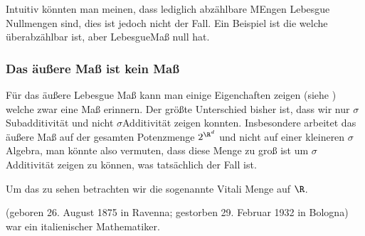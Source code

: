 \documentclass[letterpaper,10pt,german]{jupyterBook}
\begin{document}
\sphinxAtStartPar
Intuitiv könnten man meinen, dass lediglich abzählbare MEngen Lebesgue Nullmengen sind, dies ist jedoch nicht der Fall. Ein Beispiel ist die  welche überabzählbar ist, aber Lebesgue\sphinxhyphen{}Maß null hat.


\subsubsection{Das äußere Maß ist kein Maß}
\label{\detokenize{masstheorie/masstheorie:das-auszere-masz-ist-kein-masz}}\label{\detokenize{masstheorie/masstheorie:s-vitali}}
\sphinxAtStartPar
Für das äußere Lebesgue Maß kann man einige Eigenchaften zeigen (siehe {\hyperref[\detokenize{masstheorie/masstheorie:thm:outerlebesgue}]{}}) welche zwar eine Maß erinnern. Der größte Unterschied bisher ist, dass wir nur \(\sigma\)\sphinxhyphen{}Subadditivität und nicht \(\sigma\)\sphinxhyphen{}Additivität zeigen konnten. Insbesondere arbeitet das äußere Maß auf der gesamten Potenzmenge \(2^{\R^d}\) und nicht auf einer kleineren \(\sigma\)\sphinxhyphen{}Algebra, man könnte also vermuten, dass diese Menge zu groß ist um \(\sigma\)\sphinxhyphen{}Additivität zeigen zu können, was tatsächlich der Fall ist.

\sphinxAtStartPar
Um das zu sehen betrachten wir die sogenannte Vitali Menge auf \(\R\).

\begin{sphinxShadowBox}

\sphinxAtStartPar
{} (geboren 26. August 1875 in Ravenna; gestorben 29. Februar 1932 in Bologna) war ein italienischer Mathematiker.
\end{sphinxShadowBox}
\end{document}
